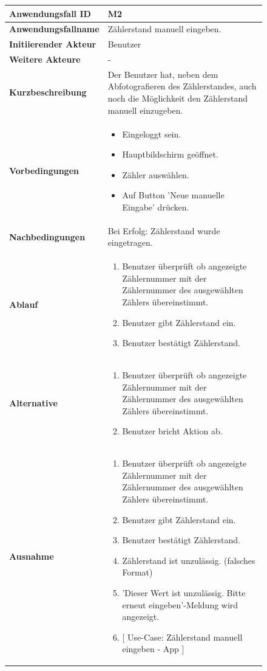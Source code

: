 \newpage

\begin{figure}[h]
	\centering
	\begin{tabularx}{\textwidth}{ X | X }
		\textbf{Anwendungsfall ID} & M2 \\ \hline
		\textbf{Anwendungsfallname} & Zählerstand manuell eingeben. \\ \hline
		\textbf{Initiierender Akteur} & Benutzer \\ \hline
		\textbf{Weitere Akteure} & - \\ \hline
		\textbf{Kurzbeschreibung} & Der Benutzer hat, neben dem Abfotografieren des Zählerstandes, auch noch die Möglichkeit den Zählerstand manuell 									einzugeben.  \\ \hline
		\textbf{Vorbedingungen} & 
		\begin {itemize}
			\item Eingeloggt sein. 
			\item Hauptbildschirm geöffnet.
			\item Zähler auswählen.
			\item Auf Button 'Neue manuelle Eingabe' drücken.
		\end{itemize}\\ \hline
		\textbf{Nachbedingungen} & Bei Erfolg: Zählerstand wurde eingetragen.  \\ \hline
		\textbf{Ablauf} &
		\begin{enumerate}
			\item Benutzer überprüft ob angezeigte Zählernummer mit der Zählernummer des ausgewählten Zählers übereinstimmt.
			\item Benutzer gibt Zählerstand ein.
			\item Benutzer bestätigt Zählerstand.
		\end{enumerate} \\ \hline
		\textbf{Alternative} &
		\begin{enumerate}
			\item Benutzer überprüft ob angezeigte Zählernummer mit der Zählernummer des ausgewählten Zählers übereinstimmt.
			\item Benutzer bricht Aktion ab.
		\end{enumerate} \\ \hline
		\textbf{Ausnahme} &
		\begin{enumerate}
			\item Benutzer überprüft ob angezeigte Zählernummer mit der Zählernummer des ausgewählten Zählers übereinstimmt.
			\item Benutzer gibt Zählerstand ein.
			\item Benutzer bestätigt Zählerstand.
			\item Zählerstand ist unzulässig. (falsches Format)

			\item 'Dieser Wert ist unzulässig. Bitte erneut eingeben'-Meldung wird angezeigt. 
 			\item $\lbrack$ Use-Case: Zählerstand manuell eingeben - App $\rbrack$
		\end{enumerate} \\


	\end{tabularx}
\end{figure}
